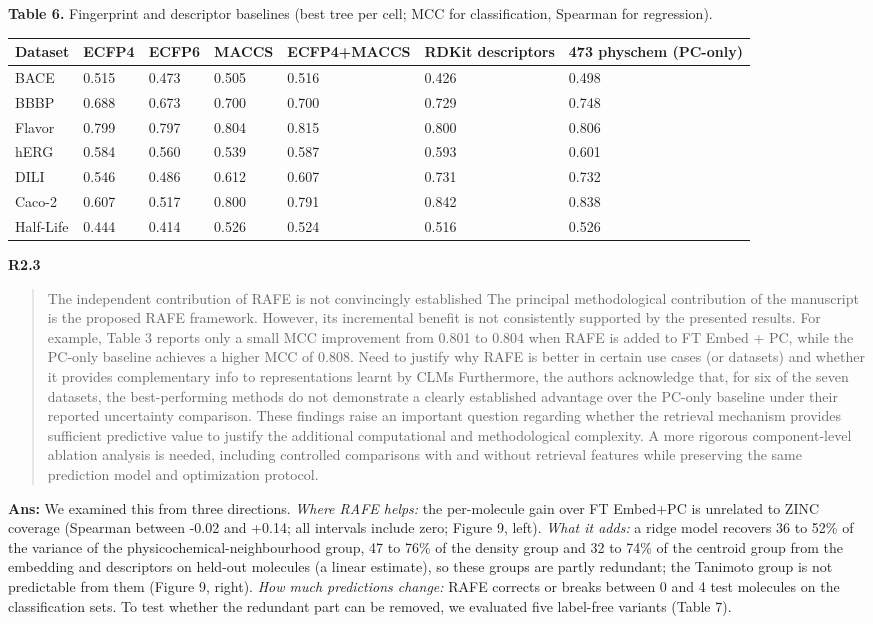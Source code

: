 \documentclass[
  10pt,
]{article}
\begin{document}
\textbf{Table 6.} Fingerprint and descriptor baselines (best tree per
cell; MCC for classification, Spearman for regression).

\begin{longtable}[]{@{}lllllll@{}}
\toprule
Dataset & ECFP4 & ECFP6 & MACCS & ECFP4+MACCS & RDKit descriptors & 473
physchem (PC-only)\tabularnewline
\midrule
\endhead
BACE & 0.515 & 0.473 & 0.505 & 0.516 & 0.426 & 0.498\tabularnewline
BBBP & 0.688 & 0.673 & 0.700 & 0.700 & 0.729 & 0.748\tabularnewline
Flavor & 0.799 & 0.797 & 0.804 & 0.815 & 0.800 & 0.806\tabularnewline
hERG & 0.584 & 0.560 & 0.539 & 0.587 & 0.593 & 0.601\tabularnewline
DILI & 0.546 & 0.486 & 0.612 & 0.607 & 0.731 & 0.732\tabularnewline
Caco-2 & 0.607 & 0.517 & 0.800 & 0.791 & 0.842 & 0.838\tabularnewline
Half-Life & 0.444 & 0.414 & 0.526 & 0.524 & 0.516 & 0.526\tabularnewline
\bottomrule
\end{longtable}

\textbf{R2.3}

\begin{quote}
The independent contribution of RAFE is not convincingly established The
principal methodological contribution of the manuscript is the proposed
RAFE framework. However, its incremental benefit is not consistently
supported by the presented results. For example, Table 3 reports only a
small MCC improvement from 0.801 to 0.804 when RAFE is added to FT Embed
+ PC, while the PC-only baseline achieves a higher MCC of 0.808. Need to
justify why RAFE is better in certain use cases (or datasets) and
whether it provides complementary info to representations learnt by CLMs
Furthermore, the authors acknowledge that, for six of the seven
datasets, the best-performing methods do not demonstrate a clearly
established advantage over the PC-only baseline under their reported
uncertainty comparison. These findings raise an important question
regarding whether the retrieval mechanism provides sufficient predictive
value to justify the additional computational and methodological
complexity. A more rigorous component-level ablation analysis is needed,
including controlled comparisons with and without retrieval features
while preserving the same prediction model and optimization protocol.
\end{quote}

\textbf{Ans:} We examined this from three directions. \emph{Where RAFE
helps:} the per-molecule gain over FT Embed+PC is unrelated to ZINC
coverage (Spearman between -0.02 and +0.14; all intervals include zero;
Figure 9, left). \emph{What it adds:} a ridge model recovers 36 to 52\%
of the variance of the physicochemical-neighbourhood group, 47 to 76\%
of the density group and 32 to 74\% of the centroid group from the
embedding and descriptors on held-out molecules (a linear estimate), so
these groups are partly redundant; the Tanimoto group is not predictable
from them (Figure 9, right). \emph{How much predictions change:} RAFE
corrects or breaks between 0 and 4 test molecules on the classification
sets. To test whether the redundant part can be removed, we evaluated
five label-free variants (Table 7).
\end{document}
